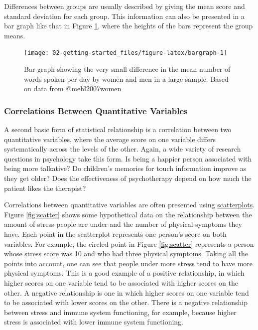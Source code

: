 \documentclass[
]{krantz}
\begin{document}
Differences between groups are usually described by giving the mean score and standard deviation for each group. This information can also be presented in a bar graph like that in Figure \ref{fig:bargraph}, where the heights of the bars represent the group means.

\begin{figure}

{\centering \texttt{[image: 02-getting-started\_files/figure-latex/bargraph-1]} 

}

\caption{Bar graph showing the very small difference in the mean number of words spoken per day by women and men in a large sample. Based on data from @mehl2007women}\label{fig:bargraph}
\end{figure}

\hypertarget{correlations-between-quantitative-variables}{%
\subsubsection*{Correlations Between Quantitative Variables}\label{correlations-between-quantitative-variables}}


A second basic form of statistical relationship is a correlation between two quantitative variables, where the average score on one variable differs systematically across the levels of the other. Again, a wide variety of research questions in psychology take this form. Is being a happier person associated with being more talkative? Do children's memories for touch information improve as they get older? Does the effectiveness of psychotherapy depend on how much the patient likes the therapist?

Correlations between quantitative variables are often presented using \protect\hyperlink{scatterplot}{scatterplots}. Figure \ref{fig:scatter} shows some hypothetical data on the relationship between the amount of stress people are under and the number of physical symptoms they have. Each point in the scatterplot represents one person's score on both variables. For example, the circled point in Figure \ref{fig:scatter} represents a person whose stress score was 10 and who had three physical symptoms. Taking all the points into account, one can see that people under more stress tend to have more physical symptoms. This is a good example of a positive relationship, in which higher scores on one variable tend to be associated with higher scores on the other. A negative relationship is one in which higher scores on one variable tend to be associated with lower scores on the other. There is a negative relationship between stress and immune system functioning, for example, because higher stress is associated with lower immune system functioning.
\end{document}
